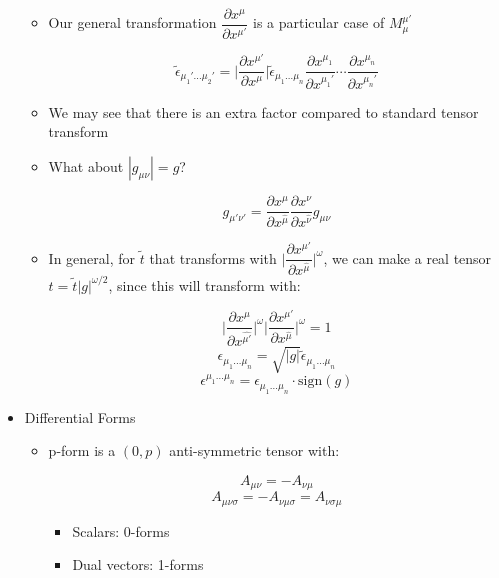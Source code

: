 \begin{itemize}
    \begin{itemize}

      \item Our general transformation $\dfrac{\partial x^{\mu}}{\partial x^{\mu'}}$ is a particular case of $M^{\mu'}_{\mu}$

        $$\tilde{\epsilon}_{\mu_1'\ldots\mu_2'}=\Big|\frac{\partial x^{\mu'}}{\partial x^{\mu}}\Big|\tilde{\epsilon}_{\mu_1\ldots\mu_n}\frac{\partial x^{\mu_1}}{\partial x^{\mu_1'}}\cdots\frac{\partial x^{\mu_n}}{\partial x^{\mu_n'}}$$

      \item We may see that there is an extra factor compared to standard tensor transform

      \item What about $|g_{\mu\nu}|=g$?

        $$g_{\mu'\nu'}=\frac{\partial x^{\mu}}{\partial x^{\hat{\mu}}}\frac{\partial x^{\nu}}{\partial x^{\hat{\nu}}}g_{\mu\nu}$$

      \item In general, for $\tilde{t}$ that transforms with $\Big|\dfrac{\partial x^{\mu'}}{\partial x^{\hat{\mu}}}\Big|^{\omega}$, we can make a real tensor $t=\tilde{t}|g|^{\omega/2}$, since this will transform with:

        $$\Big|\dfrac{\partial x^{\mu}}{\partial x^{\hat{\mu'}}}\Big|^{\omega}\Big|\dfrac{\partial x^{\mu'}}{\partial x^{\hat{\mu}}}\Big|^{\omega}=1$$
        $$\epsilon_{\mu_1\ldots\mu_n}=\sqrt{|g|}\tilde{\epsilon}_{\mu_1\ldots\mu_n}$$
        $$\epsilon^{\mu_1\ldots\mu_n}=\epsilon_{\mu_1\ldots\mu_n}\cdot\text{sign}(g)$$

    \end{itemize}

  \item Differential Forms

    \begin{itemize}

      \item p-form is a $(0,p)$ anti-symmetric tensor with:

        $$A_{\mu\nu}=-A_{\nu\mu}$$
        $$A_{\mu\nu\sigma}=-A_{\nu\mu\sigma}=A_{\nu\sigma\mu}$$

        \begin{itemize}

          \item Scalars: 0-forms

          \item Dual vectors: 1-forms


\end{itemize}
\end{itemize}
\end{itemize}
